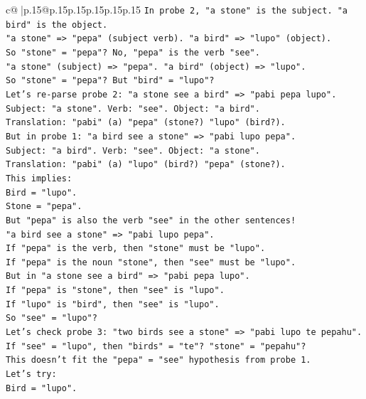 \documentclass{article}
\begin{document}
{\begin{supertabular}{c@{$\;$}|p{.15\linewidth}@{}p{.15\linewidth}p{.15\linewidth}p{.15\linewidth}p{.15\linewidth}p{.15\linewidth}}
{{{\texttt{In probe 2, "a stone" is the subject. "a bird" is the object.} \\
\texttt{"a stone" => "pepa" (subject verb). "a bird" => "lupo" (object).} \\
\texttt{So "stone" = "pepa"? No, "pepa" is the verb "see".} \\
\texttt{"a stone" (subject) => "pepa". "a bird" (object) => "lupo".} \\
\texttt{So "stone" = "pepa"? But "bird" = "lupo"?} \\
\texttt{Let's re{-}parse probe 2: "a stone see a bird" => "pabi pepa lupo".} \\
\texttt{Subject: "a stone". Verb: "see". Object: "a bird".} \\
\texttt{Translation: "pabi" (a) "pepa" (stone?) "lupo" (bird?).} \\
\texttt{But in probe 1: "a bird see a stone" => "pabi lupo pepa".} \\
\texttt{Subject: "a bird". Verb: "see". Object: "a stone".} \\
\texttt{Translation: "pabi" (a) "lupo" (bird?) "pepa" (stone?).} \\
\texttt{This implies:} \\
\texttt{Bird = "lupo".} \\
\texttt{Stone = "pepa".} \\
\texttt{But "pepa" is also the verb "see" in the other sentences!} \\
\texttt{"a bird see a stone" => "pabi lupo pepa".} \\
\texttt{If "pepa" is the verb, then "stone" must be "lupo".} \\
\texttt{If "pepa" is the noun "stone", then "see" must be "lupo".} \\
\texttt{But in "a stone see a bird" => "pabi pepa lupo".} \\
\texttt{If "pepa" is "stone", then "see" is "lupo".} \\
\texttt{If "lupo" is "bird", then "see" is "lupo".} \\
\texttt{So "see" = "lupo"?} \\
\texttt{Let's check probe 3: "two birds see a stone" => "pabi lupo te pepahu".} \\
\texttt{If "see" = "lupo", then "birds" = "te"? "stone" = "pepahu"?} \\
\texttt{This doesn't fit the "pepa" = "see" hypothesis from probe 1.} \\
\texttt{Let's try:} \\
\texttt{Bird = "lupo".} \\
}}}
\end{supertabular}}
\end{document}
